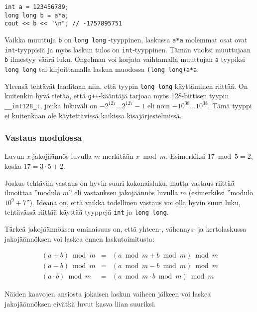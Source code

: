 \begin{lstlisting}
int a = 123456789;
long long b = a*a;
cout << b << "\n"; // -1757895751
\end{lstlisting}

Vaikka muuttuja \texttt{b} on \texttt{long long} -tyyppinen,
laskussa \texttt{a*a} molemmat osat ovat \texttt{int}-tyyppisiä
ja myös laskun tulos on \texttt{int}-tyyppinen.
Tämän vuoksi muuttujaan \texttt{b} ilmestyy väärä luku.
Ongelman voi korjata vaihtamalla muuttujan \texttt{a}
tyypiksi \texttt{long long} tai kirjoittamalla
laskun muodossa \texttt{(long long)a*a}.

Yleensä tehtävät laaditaan niin, että tyypin
\texttt{long long} käyttäminen riittää.
On kuitenkin hyvä tietää, että
\texttt{g++}-kääntäjä tarjoaa myös 128-bittisen
tyypin \texttt{\_\_int128\_t}, jonka lukuväli on
$-2^{127} \ldots 2^{127}-1$ eli noin $-10^{38} \ldots 10^{38}$.
Tämä tyyppi ei kuitenkaan ole käytettävissä kaikissa kisajärjestelmissä.

\subsubsection{Vastaus modulossa}


Luvun $x$ jakojäännös luvulla $m$
merkitään $x \bmod m$.
Esimerkiksi $17 \bmod 5 = 2$,
koska $17 = 3 \cdot 5 + 2$.

Joskus tehtävän vastaus on hyvin suuri kokonaisluku,
mutta vastaus riittää ilmoittaa ''modulo $m$''
eli vastauksen jakojäännös luvulla $m$
(esimerkiksi ''modulo $10^9+7$'').
Ideana on, että vaikka todellinen vastaus
voi olla hyvin suuri luku,
tehtävässä riittää käyttää tyyppejä \texttt{int} ja \texttt{long long}.

Tärkeä jakojäännöksen ominaisuus on,
että yhteen-, vähennys- ja kertolaskussa
jakojäännöksen voi laskea ennen laskutoimitusta:

\[
\begin{array}{rcr}
(a+b) \bmod m & = & (a \bmod m + b \bmod m) \bmod m \\
(a-b) \bmod m & = & (a \bmod m - b \bmod m) \bmod m \\
(a \cdot b) \bmod m & = & (a \bmod m \cdot b \bmod m) \bmod m
\end{array}
\]

Näiden kaavojen ansiosta
jokaisen laskun vaiheen jälkeen voi laskea jakojäännöksen
eivätkä luvut kasva liian suuriksi.

